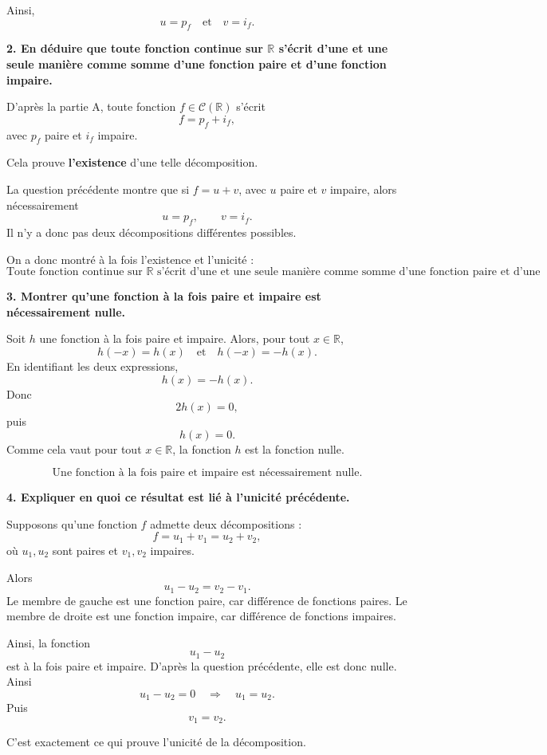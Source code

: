 \documentclass[11pt,a4paper]{article}
\newcommand{\R}{\mathbb{R}}
\begin{document}
Ainsi,
\[
\boxed{u=p_f \quad \text{et} \quad v=i_f.}
\]

\bigskip

\textbf{2. En déduire que toute fonction continue sur \(\R\) s'écrit d'une et une seule manière comme somme d'une fonction paire et d'une fonction impaire.}

D'après la partie A, toute fonction \(f\in \mathcal C(\R)\) s'écrit
\[
f=p_f+i_f,
\]
avec \(p_f\) paire et \(i_f\) impaire.

Cela prouve \textbf{l'existence} d'une telle décomposition.

La question précédente montre que si \(f=u+v\), avec \(u\) paire et \(v\) impaire, alors nécessairement
\[
u=p_f,\qquad v=i_f.
\]
Il n'y a donc pas deux décompositions différentes possibles.

On a donc montré à la fois l'existence et l'unicité :
\[
\boxed{\text{Toute fonction continue sur }\R\text{ s'écrit d'une et une seule manière comme somme d'une fonction paire et d'une fonction impaire.}}
\]

\bigskip

\textbf{3. Montrer qu'une fonction à la fois paire et impaire est nécessairement nulle.}

Soit \(h\) une fonction à la fois paire et impaire. Alors, pour tout \(x\in\R\),
\[
h(-x)=h(x)
\quad \text{et} \quad
h(-x)=-h(x).
\]
En identifiant les deux expressions,
\[
h(x)=-h(x).
\]
Donc
\[
2h(x)=0,
\]
puis
\[
h(x)=0.
\]
Comme cela vaut pour tout \(x\in\R\), la fonction \(h\) est la fonction nulle.

\[
\boxed{\text{Une fonction à la fois paire et impaire est nécessairement nulle.}}
\]

\bigskip

\textbf{4. Expliquer en quoi ce résultat est lié à l'unicité précédente.}

Supposons qu'une fonction \(f\) admette deux décompositions :
\[
f=u_1+v_1=u_2+v_2,
\]
où \(u_1,u_2\) sont paires et \(v_1,v_2\) impaires.

Alors
\[
u_1-u_2=v_2-v_1.
\]
Le membre de gauche est une fonction paire, car différence de fonctions paires.
Le membre de droite est une fonction impaire, car différence de fonctions impaires.

Ainsi, la fonction
\[
u_1-u_2
\]
est à la fois paire et impaire. D'après la question précédente, elle est donc nulle. Ainsi
\[
u_1-u_2=0 \quad \Longrightarrow \quad u_1=u_2.
\]
Puis
\[
v_1=v_2.
\]

C'est exactement ce qui prouve l'unicité de la décomposition.
\end{document}
